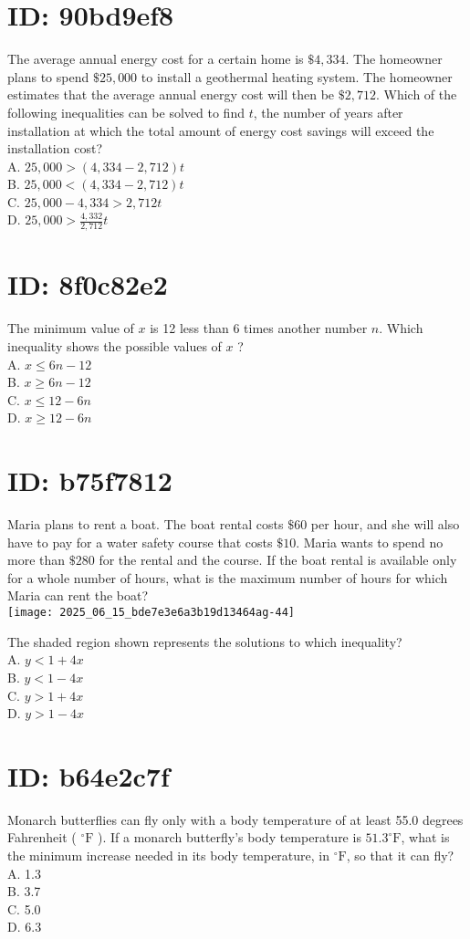 \section*{ID: 90bd9ef8}
The average annual energy cost for a certain home is $\$ 4,334$. The homeowner plans to spend $\$ 25,000$ to install a geothermal heating system. The homeowner estimates that the average annual energy cost will then be $\$ 2,712$. Which of the following inequalities can be solved to find $t$, the number of years after installation at which the total amount of energy cost savings will exceed the installation cost?\\
A. $25,000>(4,334-2,712) t$\\
B. $25,000<(4,334-2,712) t$\\
C. $25,000-4,334>2,712 t$\\
D. $25,000>\frac{4,332}{2,712} t$

\section*{ID: 8f0c82e2}
The minimum value of $x$ is 12 less than 6 times another number $n$. Which inequality shows the possible values of $x$ ?\\
A. $x \leq 6 n-12$\\
B. $x \geq 6 n-12$\\
C. $x \leq 12-6 n$\\
D. $x \geq 12-6 n$

\section*{ID: b75f7812}
Maria plans to rent a boat. The boat rental costs $\$ 60$ per hour, and she will also have to pay for a water safety course that costs $\$ 10$. Maria wants to spend no more than $\$ 280$ for the rental and the course. If the boat rental is available only for a whole number of hours, what is the maximum number of hours for which Maria can rent the boat?\\
\texttt{[image: 2025\_06\_15\_bde7e3e6a3b19d13464ag-44]}

The shaded region shown represents the solutions to which inequality?\\
A. $y<1+4 x$\\
B. $y<1-4 x$\\
C. $y>1+4 x$\\
D. $y>1-4 x$

\section*{ID: b64e2c7f}
Monarch butterflies can fly only with a body temperature of at least 55.0 degrees Fahrenheit ( ${ }^{\circ} \mathrm{F}$ ). If a monarch butterfly's body temperature is $51.3^{\circ} \mathrm{F}$, what is the minimum increase needed in its body temperature, in ${ }^{\circ} \mathrm{F}$, so that it can fly?\\
A. 1.3\\
B. 3.7\\
C. 5.0\\
D. 6.3

